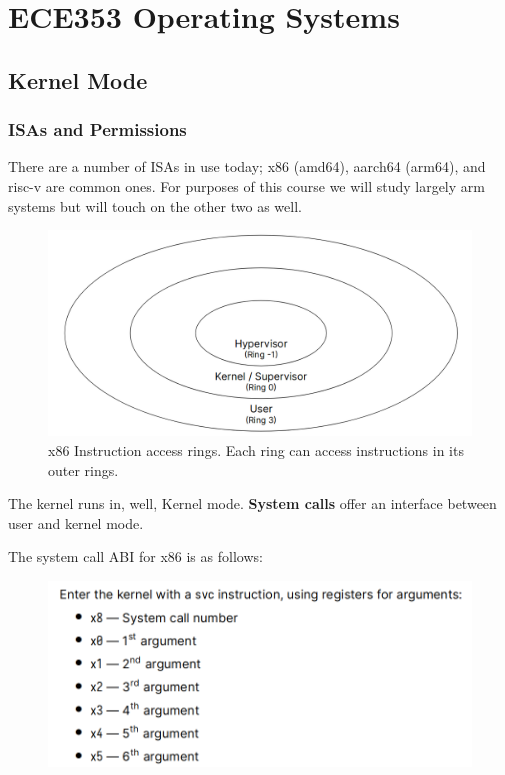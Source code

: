 \documentclass[../notes.tex]{subfiles}
\begin{document}
\section{ECE353 Operating Systems}

\subsection{Kernel Mode}
\subsubsection{ISAs and Permissions}

There are a number of ISAs in use today; x86 (amd64), aarch64 (arm64), and risc-v are common ones.
For purposes of this course we will study largely arm systems but will touch on the other two as well.

\begin{figure}[H]
  \centering
  \includegraphics[width=0.8\linewidth]{img/image_2023-01-11-15-18-10.png}
  \caption{x86 Instruction access rings. Each ring can access instructions in its outer rings.}
\end{figure}

The kernel runs in, well, Kernel mode. \textbf{System calls} offer an interface between user and kernel mode. 


The system call ABI for x86 is as follows:

\begin{figure}[H]
  \centering
  \includegraphics[width=0.8\linewidth]{img/image_2023-01-11-15-23-26.png}
\end{figure}
\end{document}
